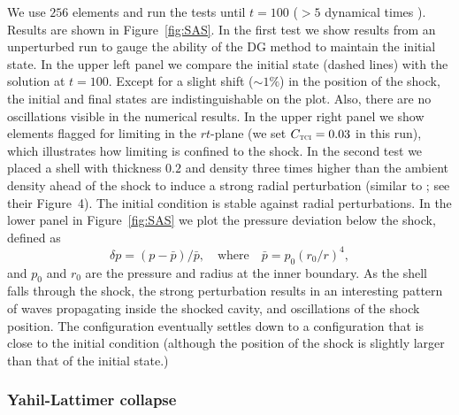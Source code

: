 \documentclass[letterpaper]{jpconf}
\newcommand{\TCI}{\textnormal{\tiny\textsc{TCI}}}
\begin{document}
We use $256$ elements and run the tests until $t=100$ ($>5$ dynamical times \cite{blondin_etal_2003}).  
Results are shown in Figure~\ref{fig:SAS}.  
In the first test we show results from an unperturbed run to gauge the ability of the DG method to maintain the initial state.  
In the upper left panel we compare the initial state (dashed lines) with the solution at $t=100$.  
Except for a slight shift ($\sim1\%$) in the position of the shock, the initial and final states are indistinguishable on the plot.  
Also, there are no oscillations visible in the numerical results.  
In the upper right panel we show elements flagged for limiting in the $rt$-plane (we set $C_{\TCI}=0.03$ in this run), which illustrates how limiting is confined to the shock.  
In the second test we placed a shell with thickness $0.2$ and density three times higher than the ambient density ahead of the shock to induce a strong radial perturbation (similar to \cite{blondin_etal_2003}; see their Figure~4).  
The initial condition is stable against radial perturbations.  
In the lower panel in Figure~\ref{fig:SAS} we plot the pressure deviation below the shock, defined as
\begin{equation}
  \delta p = (p-\bar{p})/\bar{p},
  \quad\text{where}\quad
  \bar{p}=p_{0}(r_{0}/r)^{4},
  \label{eq:pressureDeviation}
\end{equation}
and $p_{0}$ and $r_{0}$ are the pressure and radius at the inner boundary.  
As the shell falls through the shock, the strong perturbation results in an interesting pattern of waves propagating inside the shocked cavity, and oscillations of the shock position.  
The configuration eventually settles down to a configuration that is close to the initial condition (although the position of the shock is slightly larger than that of the initial state.)  

\subsubsection{Yahil-Lattimer collapse}
\end{document}
